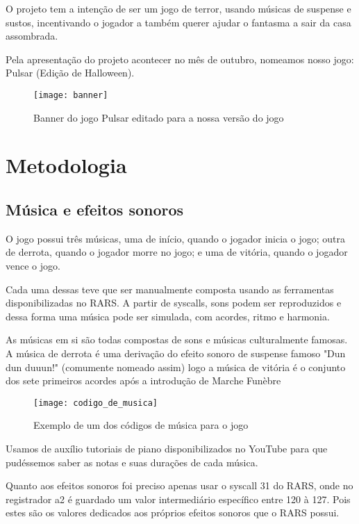 \documentclass[conference]{IEEEtran}
\begin{document}
O projeto tem a intenção de ser um jogo de terror, usando músicas de suspense e sustos, incentivando o jogador a também querer ajudar o fantasma a sair da casa assombrada.

Pela apresentação do projeto acontecer no mês de outubro, nomeamos nosso jogo: Pulsar (Edição de Halloween).


\begin{figure}[h]
\centering
\texttt{[image: banner]}
\caption{Banner do jogo Pulsar editado para a nossa versão do jogo}
\end{figure}

\section{Metodologia}

\subsection{Música e efeitos sonoros}

O jogo possui três músicas, uma de início, quando o jogador inicia o jogo; outra de derrota, quando o jogador morre no jogo; e uma de vitória, quando o jogador vence o jogo.

Cada uma dessas teve que ser manualmente composta usando as ferramentas disponibilizadas no RARS. A partir de syscalls, sons podem ser reproduzidos e dessa forma uma música pode ser simulada, com acordes, ritmo e harmonia.

As músicas em si são todas compostas de sons e músicas culturalmente famosas. A música de derrota é uma derivação do efeito sonoro de suspense famoso "Dun dun duuun!" (comumente nomeado assim\textsuperscript{\cite{b3}})
logo a música de vitória é o conjunto dos sete primeiros acordes após a introdução de Marche Funèbre\textsuperscript{\cite{b4}}

\begin{figure}[h]
\centering
\texttt{[image: codigo\_de\_musica]}
\caption{Exemplo de um dos códigos de música para o jogo}
\end{figure}  

Usamos de auxílio tutoriais de piano disponibilizados no YouTube para que pudéssemos saber as notas e suas durações de cada música.

Quanto aos efeitos sonoros foi preciso apenas usar o syscall 31 do RARS, onde no registrador a2 é guardado um valor intermediário específico entre 120 à 127. Pois estes são os valores dedicados aos próprios efeitos sonoros que o RARS possui.
\end{document}
